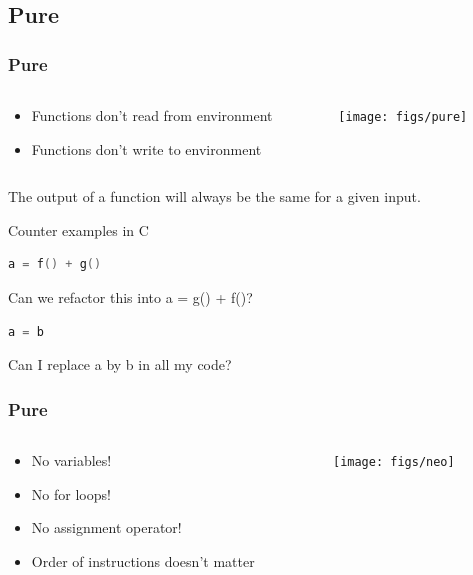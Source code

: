 \documentclass{beamer}
\begin{document}
\subsection{Pure}
\begin{frame}[fragile]
\frametitle{Pure}

 \begin{columns}[]
  \begin{column}[]{5cm}
   \begin{itemize}
    \item Functions don't read from environment
    \item Functions don't write to environment
   \end{itemize}
  \end{column}
  \begin{column}[]{5cm}
    \texttt{[image: figs/pure]}
  \end{column}
 \end{columns}
 \vspace{0.3cm}
 The output of a function will always be the same for a given input.
 
 \begin{block}{Counter examples in C}
  \begin{lstlisting}[language=C]
    a = f() + g() 
  \end{lstlisting}
  Can we refactor this into a = g() + f()?

  \begin{lstlisting}[language=C]
    a = b 
  \end{lstlisting}
  Can I replace a by b in all my code?

 \end{block}
 
\end{frame}

\begin{frame}
\frametitle{Pure}

 \begin{columns}[]
  \begin{column}[]{5cm}
   \begin{itemize}
    \item No variables!
    \item No for loops!
    \item No assignment operator!
    \item Order of instructions doesn't matter
   \end{itemize}
  \end{column}
  \begin{column}[]{5cm}
    \texttt{[image: figs/neo]}
  \end{column}
 \end{columns}
 \vspace{0.5cm}
 
\end{frame}
\end{document}
